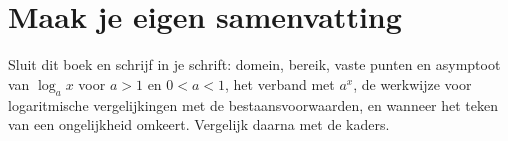 
\ifzelfstudie
\section*{Maak je eigen samenvatting}
Sluit dit boek en schrijf in je schrift: domein, bereik, vaste punten en asymptoot van $\log_a x$ voor $a > 1$ en $0 < a < 1$, het verband met $a^x$, de werkwijze voor logaritmische vergelijkingen met de bestaansvoorwaarden, en wanneer het teken van een ongelijkheid omkeert. Vergelijk daarna met de kaders.
\fi
